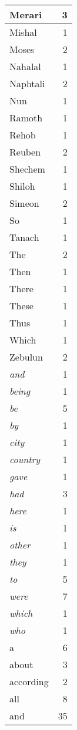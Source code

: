 \begin{center}
\begin{longtable}{l|r}
Merari & 3\\ \hline 
Mishal & 1\\ \hline 
Moses & 2\\ \hline 
Nahalal & 1\\ \hline 
Naphtali & 2\\ \hline 
Nun & 1\\ \hline 
Ramoth & 1\\ \hline 
Rehob & 1\\ \hline 
Reuben & 2\\ \hline 
Shechem & 1\\ \hline 
Shiloh & 1\\ \hline 
Simeon & 2\\ \hline 
So & 1\\ \hline 
Tanach & 1\\ \hline 
The & 2\\ \hline 
Then & 1\\ \hline 
There & 1\\ \hline 
These & 1\\ \hline 
Thus & 1\\ \hline 
Which & 1\\ \hline 
Zebulun & 2\\ \hline 
\emph{and} & 1\\ \hline 
\emph{being} & 1\\ \hline 
\emph{be} & 5\\ \hline 
\emph{by} & 1\\ \hline 
\emph{city} & 1\\ \hline 
\emph{country} & 1\\ \hline 
\emph{gave} & 1\\ \hline 
\emph{had} & 3\\ \hline 
\emph{here} & 1\\ \hline 
\emph{is} & 1\\ \hline 
\emph{other} & 1\\ \hline 
\emph{they} & 1\\ \hline 
\emph{to} & 5\\ \hline 
\emph{were} & 7\\ \hline 
\emph{which} & 1\\ \hline 
\emph{who} & 1\\ \hline 
a & 6\\ \hline 
about & 3\\ \hline 
according & 2\\ \hline 
all & 8\\ \hline 
and & 35\\ \hline 

\end{longtable}
\end{center}
